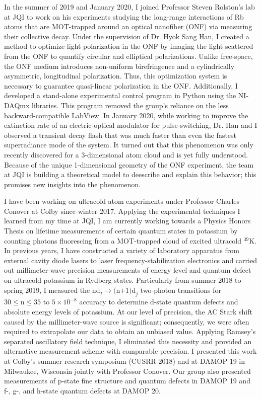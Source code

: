 \documentclass[12pt]{article}
\begin{document}
In the summer of 2019 and January 2020, I joined Professor Steven Rolston's lab at JQI to work on his experiments studying the long-range interactions of Rb atoms that are MOT-trapped around an optical nanofiber (ONF) via measuring their collective decay. Under the supervision of Dr. Hyok Sang Han, I created a method to optimize light polarization in the ONF by imaging the light scattered from the ONF to quantify circular and elliptical polarizations. Unlike free-space, the ONF medium introduces non-uniform birefringence and a cylindrically asymmetric, longitudinal polarization. Thus, this optimization system is necessary to guarantee quasi-linear polarization in the ONF. Additionally, I developed a stand-alone experimental control program in Python using the NI-DAQmx libraries. This program removed the group's reliance on the less backward-compatible LabView. In January 2020, while working to improve the extinction rate of an electric-optical modulator for pulse-switching, Dr. Han and I observed a transient decay flash that was much faster than even the fastest superradiance mode of the system. It turned out that this phenomenon was only recently discovered for a 3-dimensional atom cloud and is yet fully understood. Because of the unique 1-dimensional geometry of the ONF experiment, the team at JQI is building a theoretical model to deescribe and explain this behavior; this promises new insights into the phenomenon.  \\ \vspace{-9pt}

I have been working on ultracold atom experiments under Professor Charles Conover at Colby since winter 2017. Applying the experimental techniques I learned from my time at JQI, I am currently working towards a Physics Honors Thesis on lifetime measurements of certain quantum states in potassium by counting photons fluorescing from a MOT-trapped cloud of excited ultracold $^{39}$K. In previous years, I have constructed a variety of laboratory apparatus from external cavity diode lasers to laser frequency-stabilization electronics and carried out millimeter-wave precision measurements of energy level and quantum defect on ultracold potassium in Rydberg states. Particularly from summer 2018 to spring 2019, I measured the $\mbox{nd}_{j} \to \mbox{(n+1)d}_{j}$ two-photon transitions for $\mbox{30} \leq \mbox{n} \leq \mbox{35}$ to $\mbox{5}\times \mbox{10}^{-8}$ accuracy to determine d-state quantum defects and absolute energy levels of potassium. At our level of precision, the AC Stark shift caused by the millimeter-wave source is significant; consequently, we were often required to extrapolate our data to obtain an unbiased value. Applying Ramsey's separated oscillatory field technique, I eliminated this necessity and provided an alternative measurement scheme with comparable precision. I presented this work at Colby's summer research symposium (CUSRR 2018) and at DAMOP 19 in Milwaukee, Wisconsin jointly with Professor Conover. Our group also presented measurements of p-state fine structure and quantum defects in DAMOP 19 and f-, g-, and h-state quantum defects at DAMOP 20. \\ \vspace{-9pt}
\end{document}
